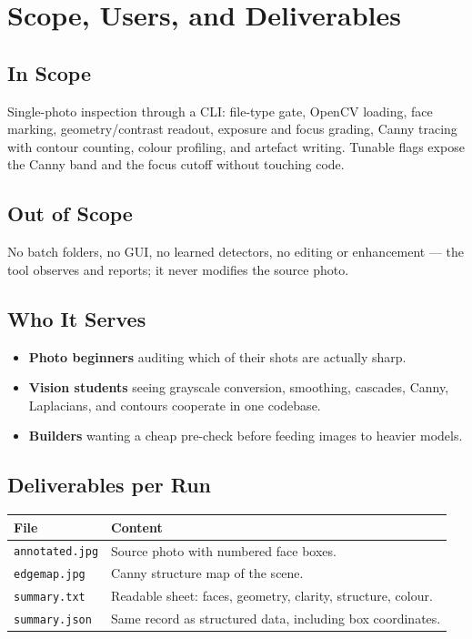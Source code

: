\documentclass[11pt,a4paper]{article}
\begin{document}
\section{Scope, Users, and Deliverables}
\subsection{In Scope}
Single-photo inspection through a CLI: file-type gate, OpenCV loading, face
marking, geometry/contrast readout, exposure and focus grading, Canny tracing
with contour counting, colour profiling, and artefact writing. Tunable flags
expose the Canny band and the focus cutoff without touching code.

\subsection{Out of Scope}
No batch folders, no GUI, no learned detectors, no editing or enhancement ---
the tool observes and reports; it never modifies the source photo.

\subsection{Who It Serves}
\begin{itemize}[leftmargin=1.5em]
  \item \textbf{Photo beginners} auditing which of their shots are actually sharp.
  \item \textbf{Vision students} seeing grayscale conversion, smoothing,
    cascades, Canny, Laplacians, and contours cooperate in one codebase.
  \item \textbf{Builders} wanting a cheap pre-check before feeding images to
    heavier models.
\end{itemize}

\subsection{Deliverables per Run}
\begin{center}
\small
\begin{tabularx}{\textwidth}{lX}
\toprule
\textbf{File} & \textbf{Content} \\
\midrule
\texttt{annotated.jpg} & Source photo with numbered face boxes. \\
\texttt{edgemap.jpg} & Canny structure map of the scene. \\
\texttt{summary.txt} & Readable sheet: faces, geometry, clarity, structure, colour. \\
\texttt{summary.json} & Same record as structured data, including box coordinates. \\
\bottomrule
\end{tabularx}
\end{center}
\end{document}

